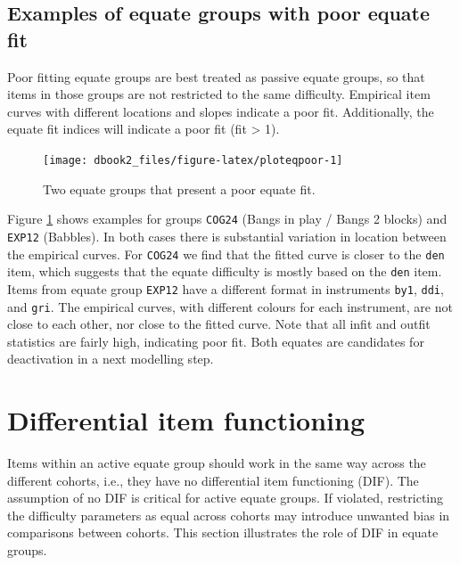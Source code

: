 \documentclass[
]{book}
\begin{document}
\hypertarget{examples-of-equate-groups-with-poor-equate-fit}{%
\subsection{Examples of equate groups with poor equate fit}\label{examples-of-equate-groups-with-poor-equate-fit}}

Poor fitting equate groups are best treated as passive equate groups, so that items in those groups are not restricted to the same difficulty. Empirical item curves with different locations and slopes indicate a poor fit. Additionally, the equate fit indices will indicate a poor fit (fit \textgreater{} 1).

\begin{figure}

{\centering \texttt{[image: dbook2\_files/figure-latex/ploteqpoor-1]} 

}

\caption{Two equate groups that present a poor equate fit.}\label{fig:ploteqpoor}
\end{figure}



Figure \ref{fig:ploteqpoor} shows examples for groups \texttt{COG24} (Bangs in play / Bangs 2 blocks) and \texttt{EXP12} (Babbles). In both cases there is substantial variation in location between the empirical curves. For \texttt{COG24} we find that the fitted curve is closer to the \texttt{den} item, which suggests that the equate difficulty is mostly based on the \texttt{den} item. Items from equate group \texttt{EXP12} have a different format in instruments \texttt{by1}, \texttt{ddi}, and \texttt{gri}. The empirical curves, with different colours for each instrument, are not close to each other, nor close to the fitted curve. Note that all infit and outfit statistics are fairly high, indicating poor fit. Both equates are candidates for deactivation in a next modelling step.

\hypertarget{sec:equatedif}{%
\section{Differential item functioning}\label{sec:equatedif}}

Items within an active equate group should work in the same way across the different cohorts, i.e., they have no differential item functioning (DIF). The assumption of no DIF is critical for active equate groups. If violated, restricting the difficulty parameters as equal across cohorts may introduce unwanted bias in comparisons between cohorts. This section illustrates the role of DIF in equate groups.
\end{document}
